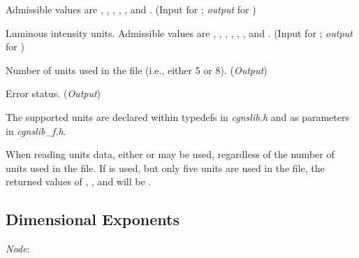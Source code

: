 \begin{Ventryi}{}
      Admissible values are , ,
      , , , and
      .
      (\textcolor{input}{Input} for ;
      \textcolor{output}{\textit{output}} for )
\item [\fort{intensity}]
      Luminous intensity units.
      Admissible values are , ,
      , , ,
      , and .
      (\textcolor{input}{Input} for ;
      \textcolor{output}{\textit{output}} for )
\item [\fort{nunits}]
      Number of units used in the file (i.e., either 5 or 8).
      (\textcolor{output}{\textit{Output}})
\item [\fort{ier}]
      Error status.
      (\textcolor{output}{\textit{Output}})
\end{Ventryi}

The supported units are declared within typedefs in \textit{cgnslib.h}
and as parameters in \textit{cgnslib\_f.h}.

When reading units data, either  or
 may be used, regardless of the number of
units used in the file.
If  is used, but only five units are used
in the file, the returned values of , ,
and  will be .

\newpage
\subsection{Dimensional Exponents}
\label{s:dimensionalexponents}

\noindent
\textit{Node}: 

